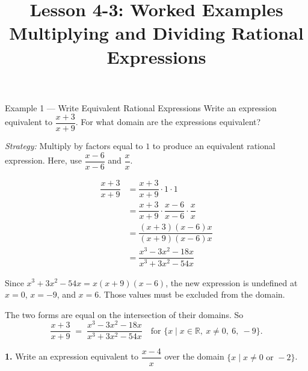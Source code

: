 \documentclass[11pt]{article}
\title{\textbf{Lesson 4-3: Worked Examples} \\ \large Multiplying and Dividing Rational Expressions}
\author{}
\date{}
\newcommand{\workspace}[1]{\vspace{#1}}
\begin{document}
\maketitle
\vspace{-2em}

\begin{example}{Example 1 --- Write Equivalent Rational Expressions}
Write an expression equivalent to $\dfrac{x+3}{x+9}$. For what domain are the expressions equivalent?

\vspace{0.5em}
\textit{Strategy:} Multiply by factors equal to $1$ to produce an equivalent rational expression. Here, use $\dfrac{x-6}{x-6}$ and $\dfrac{x}{x}$.

\begin{align*}
\dfrac{x+3}{x+9} &= \dfrac{x+3}{x+9}\cdot 1 \cdot 1 \\[4pt]
&= \dfrac{x+3}{x+9}\cdot \dfrac{x-6}{x-6}\cdot \dfrac{x}{x} \\[4pt]
&= \dfrac{(x+3)(x-6)x}{(x+9)(x-6)x} \\[4pt]
&= \dfrac{x^{3}-3x^{2}-18x}{x^{3}+3x^{2}-54x}
\end{align*}

\begin{annot}
Since $x^{3}+3x^{2}-54x = x(x+9)(x-6)$, the new expression is undefined at $x=0$, $x=-9$, and $x=6$. Those values must be excluded from the domain.
\end{annot}

The two forms are equal on the intersection of their domains. So
\[
\dfrac{x+3}{x+9} \;=\; \dfrac{x^{3}-3x^{2}-18x}{x^{3}+3x^{2}-54x} \quad \text{for } \{x \mid x \in \mathbb{R},\ x \neq 0,\ 6,\ -9\}.
\]
\end{example}

\begin{tryit}
\textbf{1.} Write an expression equivalent to $\dfrac{x-4}{x}$ over the domain $\{x \mid x \neq 0 \text{ or } -2\}$.
\workspace{4cm}
\end{tryit}

\newpage
\end{document}
